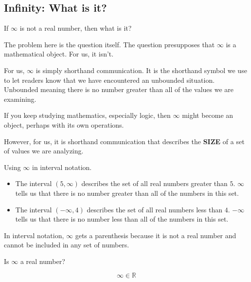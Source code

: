 \documentclass{ximera}
\begin{document}
\subsection*{Infinity: What is it?}


If $\infty$ is not a real number, then what is it?


The problem here is the question itself.  The question presupposes that $\infty$ is a mathematical object.  For us, it isn't.   

For us, $\infty$ is simply shorthand communication.  It is the shorthand symbol we use to let readers know that we have encountered an unbounded situation. Unbounded meaning there is no number greater than all of the values we are examining.


If you keep studying mathematics, especially logic, then $\infty$ might become an object, perhaps with its own operations.

However, for us, it is shorthand communication that describes the \textbf{SIZE} of a set of values we are analyzing.







\begin{example}
Using $\infty$ in interval notation.



\begin{itemize}
\item The interval $(5, \infty)$ describes the set of all real numbers greater than $5$.  $\infty$ tells us that there is no number greater than all of the numbers in this set.



\item The interval $(-\infty, 4)$ describes the set of all real numbers less than $4$.  $-\infty$ tells us that there is no number less than all of the numbers in this set.
\end{itemize}




\end{example}


In interval notation, $\infty$ gets a parenthesis because it is not a real number and cannot be included in any set of numbers.






\begin{question}
Is $\infty$ a real number?

\[  \infty \in \mathbb{R}  \]


\begin{multipleChoice}
\end{multipleChoice}


\end{question}
\end{document}
